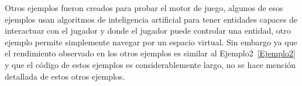 Otros ejemplos fueron creados para probar el motor de juego, algunos de esos ejemplos usan algoritmos de inteligencia artificial para tener entidades capaces de interactuar con el jugador y donde el jugador puede controlar una entidad, otro ejemplo permite simplemente navegar por un espacio virtual. Sin embargo ya que el rendimiento observado en los otros ejemplos es similar al Ejemplo2~\ref{Ejemplo2} y que el código de estos ejemplos es considerablemente largo, no se hace mención detallada de estos otros ejemplos.





